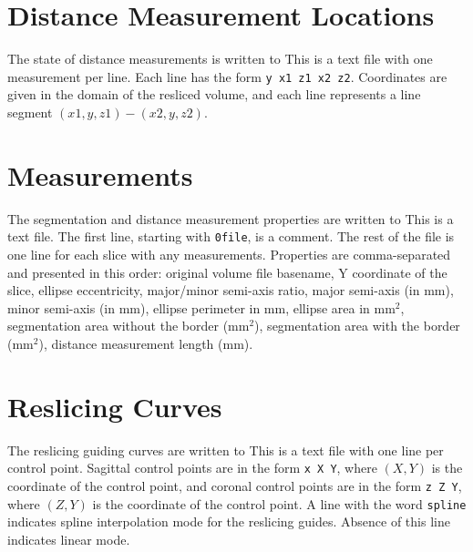 \documentclass[12pt]{report}
\begin{document}
\section{Distance Measurement Locations}

The state of distance measurements is written to
 This is a text file with one measurement per
line. Each line has the form \texttt{y x1 z1 x2 z2}. Coordinates are given
in the domain of the resliced volume, and each line represents a line
segment $(x1,y,z1)-(x2,y,z2)$.

\section{Measurements}

The segmentation and distance measurement properties are written to
 This is a text file. The first line,
starting with \texttt{0file}, is a comment. The rest of the file is
one line for each slice with any measurements. Properties are comma-separated
and presented in this order: original volume file basename, Y coordinate of the slice, 
ellipse eccentricity, major/minor semi-axis ratio, major semi-axis (in mm), minor
semi-axis (in mm), ellipse perimeter in mm, ellipse area in mm$^2$, segmentation
area without the border (mm$^2$), segmentation area with the border (mm$^2$),
distance measurement length (mm). 

\section{Reslicing Curves}

The reslicing guiding curves are written to
 This is a text file with one line per
control point. Sagittal control points are in the form \texttt{x X Y},
where $(X,Y)$ is the coordinate of the control point, and coronal
control points are in the form \texttt{z Z Y}, where $(Z,Y)$ is the
coordinate of the control point. A line with the word \texttt{spline}
indicates spline interpolation mode for the reslicing guides. Absence
of this line indicates linear mode.
\end{document}
